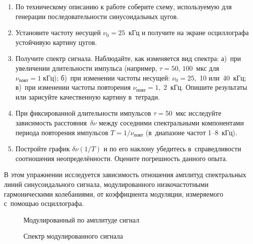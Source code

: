 \begin{lab:task}
\begin{enumerate}

\item По техническому описанию к работе соберите схему, используемую
для генерации последовательности синусоидальных цугов.

\item Установите частоту несущей $\nu_0=25$~кГц и получите на экране осциллографа
устойчивую картину цугов.

\item Получите спектр сигнала. Наблюдайте, как изменяется вид спектра:
а)~при увеличении длительности импульса (например, $\tau=50$, $100$~мкс
для $\nu_\text{повт}=1\;кГц$); б)~при изменении частоты несущей:
$\nu_0=25$,~10 или~40~кГц; в)~при изменении частоты повторения
$\nu_{повт}=1,\;2$~кГц. Опишите результаты или зарисуйте качественную
картину в~тетради.

\item При фиксированной длительности импульсов $\tau=50$~мкс исследуйте
зависимость расстояния~$\delta \nu$ между соседними спектральными компонентами
периода повторения импульсов $T=1/\nu_\text{повт}$
(в~диапазоне частот 1--8~кГц).

\item Постройте график $\delta \nu(1/T)$ и по его наклону
убедитесь в~справедливости соотношения неопределённости.
Оцените погрешность данного опыта.

\end{enumerate}


В этом упражнении исследуется зависимость отношения амплитуд спектральных линий
синусоидального сигнала, модулированного низкочастотными гармоническими
колебаниями, от коэффициента модуляции, измеряемого с~помощью осциллографа.

\begin{figure}[h!]
\hfil\hfil
\begin{minipage}{0.4\textwidth}
    \caption{Модулированный по амплитуде сигнал}
\end{minipage}
\hfil
\begin{minipage}{0.4\textwidth}
    \caption{Спектр модулированного сигнала}
\end{minipage}
\end{figure}


\end{lab:task}
